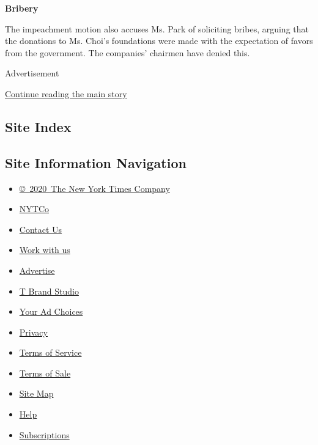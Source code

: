 \textbf{Bribery}

The impeachment motion also accuses Ms. Park of soliciting bribes,
arguing that the donations to Ms. Choi's foundations were made with the
expectation of favors from the government. The companies' chairmen have
denied this.

Advertisement

\protect\hyperlink{after-bottom}{Continue reading the main story}

\hypertarget{site-index}{%
\subsection{Site Index}\label{site-index}}

\hypertarget{site-information-navigation}{%
\subsection{Site Information
Navigation}\label{site-information-navigation}}

\begin{itemize}
\tightlist
\item
  \href{https://help.nytimes.com/hc/en-us/articles/115014792127-Copyright-notice}{©~2020~The
  New York Times Company}
\end{itemize}

\begin{itemize}
\tightlist
\item
  \href{https://www.nytco.com/}{NYTCo}
\item
  \href{https://help.nytimes.com/hc/en-us/articles/115015385887-Contact-Us}{Contact
  Us}
\item
  \href{https://www.nytco.com/careers/}{Work with us}
\item
  \href{https://nytmediakit.com/}{Advertise}
\item
  \href{http://www.tbrandstudio.com/}{T Brand Studio}
\item
  \href{https://www.nytimes.com/privacy/cookie-policy\#how-do-i-manage-trackers}{Your
  Ad Choices}
\item
  \href{https://www.nytimes.com/privacy}{Privacy}
\item
  \href{https://help.nytimes.com/hc/en-us/articles/115014893428-Terms-of-service}{Terms
  of Service}
\item
  \href{https://help.nytimes.com/hc/en-us/articles/115014893968-Terms-of-sale}{Terms
  of Sale}
\item
  \href{https://spiderbites.nytimes.com}{Site Map}
\item
  \href{https://help.nytimes.com/hc/en-us}{Help}
\item
  \href{https://www.nytimes.com/subscription?campaignId=37WXW}{Subscriptions}
\end{itemize}
